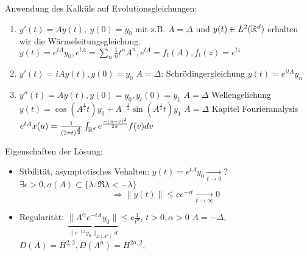  Anwendung des Kalküls auf Evolutionsgleichungen:
 \begin{enumerate}[label=\roman*\upshape)]
 	\item  $y'(t) = A y(t), ~ y(0) = y_{0} $
 		mit z.B. $A = \Delta$ und $y (t) \in L^{2}(\mathbb{R}^{d})$ erhalten wir die Wärmeleitungsgleichung.
		$y(t) = e^{tA} y_{0}, e^{t A} = \sum_{n} \frac{1}{n} t^{n} A^{n}, e^{tA} = f_{t}(A), f_{t}(z) = e^{tz}$ 
	\item $y'(t) = i A y(t), y(0) = y_{0}$ 
		$A = \Delta$: Schrödingergleichung
		$y(t) = e^{i t A} y_{n}$
	\item $y''(t) = A y(t), y(0) = y_{0}, y_{t}(0) = y_{1}$
		$A = \Delta$ Wellengelichung
		$y(t) = \cos(A^{\frac{1}{2}}t) y_{0} + A^{-\frac{1}{2}} \sin(A^{\frac{1}{2}} t) y_{1}$
		$A = \Delta$ Kapitel Fourieranalysis
		$e^{tA}x(u) = \frac{1}{(2 \pi t)^{\frac{d}{2}}} \int_{\mathbb{R}^{d}} e^{\frac{-(u - v)^{2}}{2 \pi}} f(v) dv$
 \end{enumerate}
Eigenschaften der Lösung:
\begin{itemize}
	\item Stbilität, asymptotisches Vehalten:
		$y(t) = e^{t A}y_{0} \xrightarrow[t \rightarrow 0]{} ?$
		$\exists \epsilon > 0, \sigma(A) \subset \{ \lambda : \Re \lambda < - \lambda \}$
		\[ \Rightarrow \| y(t) \| \leq c e^{- \epsilon t} \xrightarrow[t \rightarrow \infty]{} 0 \]
	\item Regularität:
		$\underbrace{\| A^{\alpha} e^{- t A} y_{0} \|}_{\| e^{-tA} y_{0} \|_{D(A^{\alpha})} d} \leq c \frac{1}{t^{\alpha}}$, $t > 0, \alpha > 0$
		$A = - \Delta$, $D(A) = H^{2, 2}, D(A^{n}) = H^{2n, 2},$
\end{itemize}
 
 
\newpage